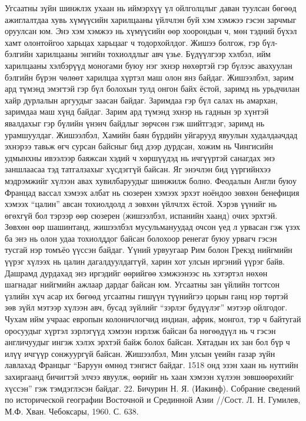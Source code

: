 Угсаатны зүйн шинжлэх ухаан нь иймэрхүү үл ойлголцлыг даван туулсан бөгөөд ажиглалтдаа хувь хүмүүсийн харилцааны үйлчлэн буй хэм хэмжээ гэсэн зарчмыг оруулсан юм. Энэ хэм хэмжээ нь хүмүүсийн өөр хоорондын ч, мөн тэдний бүхэл хамт олонтойгоо харьцах харьцааг ч тодорхойлдог. Жишээ болгож, гэр бүл-бэлгийн харилцааны энгийн тохиолдлыг авч үзье. Бүдүүлгээр хэлбэл, ийм харилцааны хэлбэрүүд моногами буюу нэг эхнэр нөхөртэй гэр бүлээс авахуулан бэлгийн бүрэн чөлөөт харилцаа хүртэл маш олон янз байдаг. Жишээлбэл, зарим ард түмэнд эмэгтэй гэр бүл болохын тулд онгон байх ёстой, заримд нь урьдчилан хайр дурлалын аргуудыг заасан байдаг. Заримдаа гэр бүл салах нь амархан, заримдаа маш хүнд байдаг. Зарим ард түмэнд эхнэр нь гаднын эр хүнтэй явалдахыг гэр бүлийн үнэнч байдлыг зөрчсөн гэж шийтгэдэг, заримд нь урамшуулдаг. Жишээлбэл, Хамийн баян бүрдийн уйгарууд явуулын худалдаачдад эхнэрээ тавьж өгч сурсан байсныг бид дээр дурдсан, хожим нь Чингисийн удмынхны ивээлээр баяжсан хэдий ч хөршүүдэд нь ичгүүртэй санагдах энэ заншлаасаа тэд татгалзахыг хүсдэггүй байсан.
Яг энэчлэн бид үүргийнхээ мэдрэмжийг хүлээн авах хувилбаруудыг шинжилж болно. Феодалын Англи буюу Францад вассал хэмээх албат нь сюзерен хэмээх эрхэт ноёндоо зөвхөн бенефиция хэмээх “цалин” авсан тохиолдолд л зөвхөн үйлчлэх ёстой. Хэрэв үүнийг нь өгөхгүй бол тэрээр өөр сюзерен (жишээлбэл, испанийн хаанд) очих эрхтэй. Зөвхөн өөр шашинтанд, жишээлбэл мусульмануудад очсон үед л урвасан гэж үзэх ба энэ нь олон удаа тохиолддог байсан болохоор ренегат буюу урвагч гэсэн тусгай нэр томъёо үүссэн байдаг. Үүний урвуугаар Рим болон Грекэд нийгмийн үүрэг хүлээх нь цалин дагалдуулдаггүй, харин хот улсын иргэний үүрэг байв. Дашрамд дурдахад энэ иргэдийг өөрийгөө хэмжээнээс нь хэтэртэл нөхөн шагнадаг нийгмийн ажлаар дардаг байсан юм.
Угсаатны зан үйлийн тогтсон үзлийн хүч асар их бөгөөд угсаатны гишүүн түүнийгээ цорын ганц нэр төртэй зөв зүйл мэтээр хүлээн авч, бусад зүйлийг “зэрлэг бүдүүлэг” мэтээр ойлгодог. Чухам ийм учраас европын колоничлогчид индиан, африк, монгол, тэр ч байтугай оросуудыг хүртэл зэрлэгүүд хэмээн нэрлэж байсан ба нөгөөдүүл нь ч гэсэн англичуудыг ингэж хэлэх эрхтэй байж болох байсан. Хятадын их зан бол бүр ч илүү ичгүүр сонжуургүй байсан. Жишээлбэл, Мин улсын үеийн газар зүйн лавлахад Францыг “Баруун өмнөд тэнгист байдаг. 1518 онд эзэн хаан нь нутгийн захиргаанд бичигтэй элчээ явуулж, өөрийг нь хаан хэмээн хүлээн зөвшөөрөхийг хүссэн” гэж тэмдэглэсэн байдаг. 22. Бичурин Н. Я. (Иакинф). Собрание сведений по исторической географии Восточной и Срединной Азии //Сост. Л. Н. Гумилев, М.Ф. Хван. Чебоксары, 1960. С. 638.
